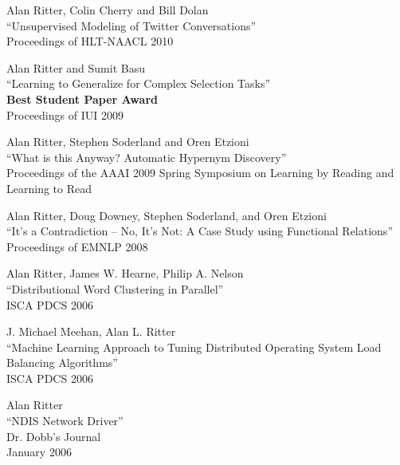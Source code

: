 \documentclass[margin,line]{res}
\newenvironment{list2}{
  \begin{list}{$\bullet$}{%
      \setlength{\itemsep}{0in}
      \setlength{\parsep}{0in} \setlength{\parskip}{0in}
      \setlength{\topsep}{0in} \setlength{\partopsep}{0in} 
      \setlength{\leftmargin}{0.2in}}}{\end{list}}
\begin{document}
\begin{resume}
Alan Ritter, Colin Cherry and Bill Dolan \\
``Unsupervised Modeling of Twitter Conversations'' \\
Proceedings of HLT-NAACL 2010

Alan Ritter and Sumit Basu \\
``Learning to Generalize for Complex Selection Tasks'' \\
{\bf Best Student Paper Award} \\
Proceedings of IUI 2009

Alan Ritter, Stephen Soderland and Oren Etzioni \\
``What is this Anyway?  Automatic Hypernym Discovery'' \\
Proceedings of the AAAI 2009 Spring Symposium on Learning by Reading and Learning to Read

Alan Ritter, Doug Downey, Stephen Soderland, and Oren Etzioni \\
``It's a Contradiction -- No, It's Not: A Case Study using Functional Relations'' \\
Proceedings of EMNLP 2008

Alan Ritter, James W. Hearne, Philip A. Nelson \\
``Distributional Word Clustering in Parallel'' \\
ISCA PDCS 2006

J. Michael Meehan, Alan L. Ritter \\
``Machine Learning Approach to Tuning Distributed Operating System Load Balancing Algorithms'' \\
ISCA PDCS 2006

Alan Ritter \\
``NDIS Network Driver'' \\
Dr. Dobb's Journal \\
January 2006

\begin{comment}
\section{\sc Skills} 
\begin{list2}
\item Languages:  C, C++, C\#, Java, Perl, Python, bash, Lisp, R, x86 assembly, Fortran, etc\ldots
\item APIs: MPI, POSIX, Win32, .NET, Lucene, etc\ldots
\end{list2}
\end{comment}

\newpage


\end{resume}
\end{document}
